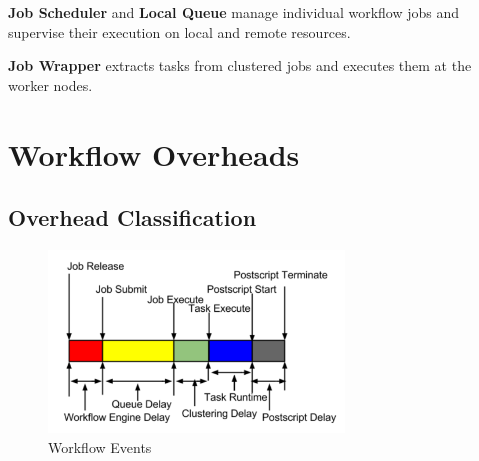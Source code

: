 \textbf{Job Scheduler} and \textbf{Local Queue} manage individual workflow jobs and supervise their execution on local and remote resources.

\textbf{Job Wrapper} extracts tasks from clustered jobs and executes them at the worker nodes. 






\section{Workflow Overheads}
\subsection{Overhead Classification}


\begin{figure}[h!]
	\centering
    \includegraphics[width=0.7\textwidth]{figures/model/overhead.pdf}
    \caption{Workflow Events}
    \label{fig:model_overhead}
\end{figure}


